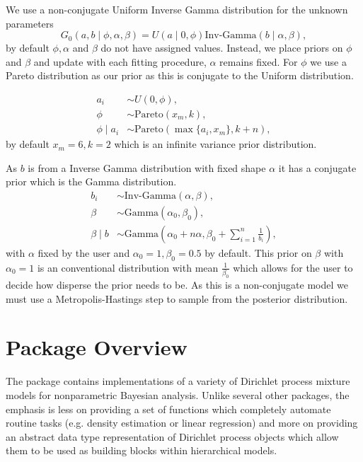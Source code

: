 \documentclass[nojss]{jss}
\begin{document}
We use a non-conjugate Uniform Inverse Gamma distribution for the unknown parameters
\begin{equation}
G_0 (a, b \mid \phi, \alpha, \beta) = U(a \mid 0, \phi ) \text{Inv-Gamma} ( b \mid \alpha, \beta),
\end{equation}
by default $\phi, \alpha$ and $\beta$ do not have assigned values. Instead, we place priors on $\phi$ and $\beta$ and update with each fitting procedure, $\alpha$ remains fixed. For $\phi$ we use a Pareto distribution as our prior as this is conjugate to the Uniform distribution.

\begin{align*}
a_i & \sim U(0, \phi) ,\\
\phi & \sim \text{Pareto}(x_m , k), \\
\phi \mid a _i & \sim \text{Pareto}( \max \{ a_i , x_m \}, k + n),
\end{align*}
by default $x_m = 6, k=2$ which is an infinite variance prior distribution.

As $b$ is from a Inverse Gamma distribution with fixed shape $\alpha$ it has a conjugate prior which is the Gamma distribution.
\begin{align*}
b_i & \sim \text{Inv-Gamma} ( \alpha , \beta ), \\
\beta & \sim \text{Gamma} (\alpha _0 , \beta _0), \\
\beta \mid b & \sim \text{Gamma} \left( \alpha _0 + n \alpha , \beta _0 + \sum _{i=1} ^n \frac{1}{b_i} \right),
\end{align*}
with $\alpha$ fixed by the user and $ \alpha _0 = 1, \beta _0 = 0.5$ by default. This prior on $\beta$ with $\alpha _0=1$ is an conventional distribution with mean $\frac{1}{\beta _0}$ which allows for the user to decide how disperse the prior needs to be. As this is a non-conjugate model we must use a Metropolis-Hastings step to sample from the posterior distribution.

\section{Package Overview}
\label{sec:package}

The  package contains implementations of a variety of Dirichlet process mixture models for nonparametric Bayesian analysis. Unlike several other  packages, the emphasis is less on providing a set of functions which completely automate routine tasks (e.g. density estimation or linear regression) and more on providing an abstract data type representation of Dirichlet process objects which allow them to be used as building blocks within hierarchical models.
\end{document}
